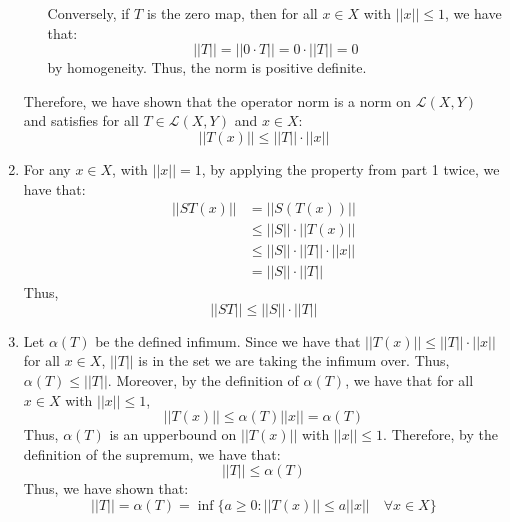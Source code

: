 \documentclass[12pt]{article}
\begin{document}
\begin{solution}
\begin{enumerate}
\begin{enumerate}
            Conversely, if $T$ is the zero map, then for all $x \in X$ with $||x|| \leq 1$, we have that:
            \[ ||T|| = ||0 \cdot T|| = 0 \cdot ||T|| = 0\]
            by homogeneity. Thus, the norm is positive definite.
        \end{enumerate}
        Therefore, we have shown that the operator norm is a norm on $\mathcal{L}(X, Y)$ and satisfies for all $T \in \mathcal{L}(X, Y)$ and $x \in X$:
        \[ ||T(x)|| \leq ||T|| \cdot ||x||\]
        \item For any $x \in X$, with $||x|| = 1$, by applying the property from part 1 twice, we have that: 
        \begin{align*}
            ||ST(x)|| &= ||S(T(x))|| \\
            &\leq ||S|| \cdot ||T(x)|| \\
            &\leq ||S|| \cdot ||T|| \cdot ||x|| \\
            &= ||S|| \cdot ||T||
        \end{align*}
        Thus,
        \[ ||ST|| \leq ||S|| \cdot ||T||\]
        \item Let $\alpha(T)$ be the defined infimum. \bbni
        Since we have that $||T(x)|| \leq ||T||\cdot ||x||$ for all $x \in X$, $||T||$ is in the set we are taking the infimum over. Thus, $\alpha(T) \leq ||T||$. \bbni
        Moreover, by the definition of $\alpha(T)$, we have that for all $x \in X$ with $||x|| \leq 1$,
        \[ ||T(x)|| \leq \alpha(T)||x|| = \alpha(T) \]
        Thus, $\alpha(T)$ is an upperbound on $||T(x)||$ with $||x|| \leq 1$. Therefore, by the definition of the supremum, we have that:
        \[ ||T|| \leq \alpha(T)\]
        Thus, we have shown that:
        \[ ||T|| = \alpha(T) = \inf\{ a \geq 0 : ||T(x)|| \leq a||x|| \quad \forall x \in X\}\]
    \end{enumerate}
\end{solution}
\newpage 
\end{document}
